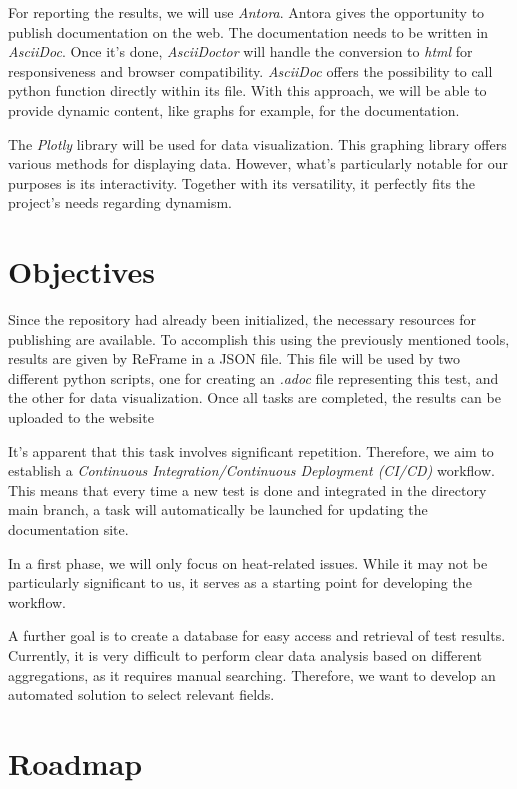 \documentclass[12pt]{article}
\begin{document}
For reporting the results, we will use \textit{Antora}\cite*{Antora}. Antora gives the opportunity to publish documentation on the web.
The documentation needs to be written in \textit{AsciiDoc}. Once it's done, \textit{AsciiDoctor} will handle the conversion to \textit{html}
for responsiveness and browser compatibility.
\textit{AsciiDoc} offers the possibility to call python function directly within its file. With this approach, we will be able to provide dynamic content,
like graphs for example, for the documentation.

\newpage
The \textit{Plotly} library will be used for data visualization. This graphing library offers various methods for displaying data. However,
what's particularly notable for our purposes is its interactivity. Together with its versatility, it perfectly fits the project's needs
regarding dynamism.


\section{Objectives}
Since the repository had already been initialized, the necessary resources for publishing are available.
To accomplish this using the previously mentioned tools, results are given by ReFrame in a JSON file.
This file will be used by two different python scripts,
one for creating an \textit{.adoc} file representing this test, and the other for data visualization.
Once all tasks are completed, the results can be uploaded to the website

It's apparent that this task involves significant repetition. Therefore, we aim to establish a \textit{Continuous Integration/Continuous Deployment (CI/CD)} workflow.
This means that every time a new test is done and integrated in the directory main branch, a task will automatically be launched for updating the documentation site.

In a first phase, we will only focus on heat-related issues. While it may not be particularly significant to us,
it serves as a starting point for developing the workflow.

A further goal is to create a database for easy access and retrieval of test results.
Currently, it is very difficult to perform clear data analysis based on different aggregations, as it requires manual searching.
Therefore, we want to develop an automated solution to select relevant fields.


\newpage
\section{Roadmap}
\end{document}
